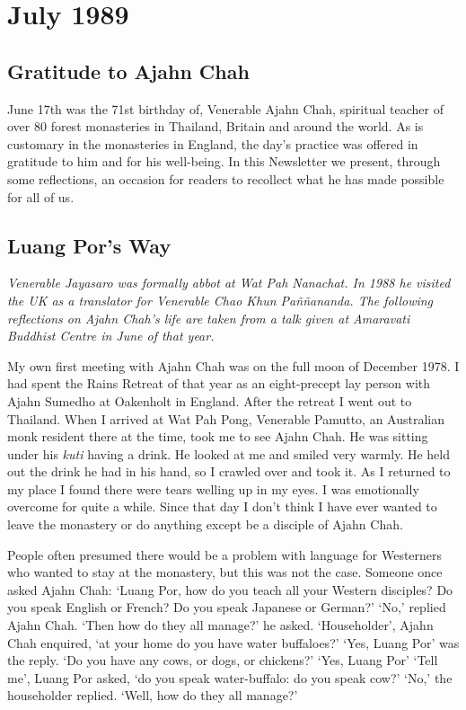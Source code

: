 
\chapter{July 1989}

\section{Gratitude to Ajahn Chah}

June 17th was the 71st birthday of, Venerable Ajahn Chah, spiritual
teacher of over 80 forest monasteries in Thailand, Britain and around
the world. As is customary in the monasteries in England, the day's
practice was offered in gratitude to him and for his well-being. In this
Newsletter we present, through some reflections, an occasion for readers
to recollect what he has made possible for all of us. 

\section{Luang Por's Way}

\emph{Venerable Jayasaro was formally abbot at Wat Pah
Nanachat. In 1988 he visited the UK as a translator for Venerable Chao
Khun Paññananda. The following reflections on Ajahn Chah's life are
taken from a talk given at Amaravati Buddhist Centre in June of that
year.}

My own first meeting with Ajahn Chah was on the full moon of December
1978. I had spent the Rains Retreat of that year as an eight-precept lay
person with Ajahn Sumedho at Oakenholt in England. After the retreat I
went out to Thailand. When I arrived at Wat Pah Pong, Venerable Pamutto, 
an Australian monk resident there at the time, took me to see Ajahn
Chah. He was sitting under his \emph{kuti} having a drink. He looked at
me and smiled very warmly. He held out the drink he had in his hand, so
I crawled over and took it. As I returned to my place I found there were
tears welling up in my eyes. I was emotionally overcome for quite a
while. Since that day I don't think I have ever wanted to leave the
monastery or do anything except be a disciple of Ajahn Chah. 

People often presumed there would be a problem with language for
Westerners who wanted to stay at the monastery, but this was not the
case. Someone once asked Ajahn Chah: `Luang Por, how do you teach all
your Western disciples? Do you speak English or French? Do you speak
Japanese or German?' `No,' replied Ajahn Chah. `Then how do they all
manage?' he asked. `Householder', Ajahn Chah enquired, `at your home do
you have water buffaloes?' `Yes, Luang Por' was the reply. `Do you have
any cows, or dogs, or chickens?' `Yes, Luang Por' `Tell me', Luang Por
asked, `do you speak water-buffalo: do you speak cow?' `No,' the
householder replied. `Well, how do they all manage?'


